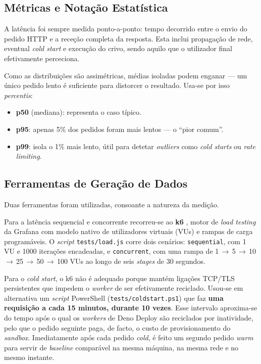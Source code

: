 \documentclass[conference]{IEEEtran}
\begin{document}
\subsection{Métricas e Notação Estatística}
A latência foi sempre medida ponto-a-ponto: tempo decorrido entre o envio do pedido HTTP e a receção completa da resposta. Esta inclui propagação de rede, eventual \textit{cold start} e execução do crivo, sendo aquilo que o utilizador final efetivamente perceciona.

Como as distribuições são assimétricas, médias isoladas podem enganar — um único pedido lento é suficiente para distorcer o resultado. Usa-se por isso \textit{percentis}:

\begin{itemize}
  \item \textbf{p50} (mediana): representa o caso típico.
  \item \textbf{p95}: apenas 5\% dos pedidos foram mais lentos — o ``pior comum''.
  \item \textbf{p99}: isola o 1\% mais lento, útil para detetar \textit{outliers} como \textit{cold starts} ou \textit{rate limiting}.
\end{itemize}

\subsection{Ferramentas de Geração de Dados}
Duas ferramentas foram utilizadas, consoante a natureza da medição.

Para a latência sequencial e concorrente recorreu-se ao \textbf{k6} \cite{k6}, motor de \textit{load testing} da Grafana com modelo nativo de utilizadores virtuais (VUs) e rampas de carga programáveis. O \textit{script} \texttt{tests/load.js} corre dois cenários: \texttt{sequential}, com 1 VU e 1000 iterações encadeadas, e \texttt{concurrent}, com uma rampa de 1\,$\rightarrow$\,5\,$\rightarrow$\,10\,$\rightarrow$\,25\,$\rightarrow$\,50\,$\rightarrow$\,100 VUs ao longo de seis \textit{stages} de 30 segundos.

Para o \textit{cold start}, o k6 não é adequado porque mantém ligações TCP/TLS persistentes que impedem o \textit{worker} de ser efetivamente reciclado. Usou-se em alternativa um \textit{script} PowerShell (\texttt{tests/coldstart.ps1}) que faz \textbf{uma requisição a cada 15 minutos, durante 10 vezes}. Esse intervalo aproxima-se do tempo após o qual os \textit{workers} de Deno Deploy são reciclados por inatividade, pelo que o pedido seguinte paga, de facto, o custo de provisionamento do \textit{sandbox}. Imediatamente após cada pedido \textit{cold}, é feito um segundo pedido \textit{warm} para servir de \textit{baseline} comparável na mesma máquina, na mesma rede e no mesmo instante.
\end{document}
